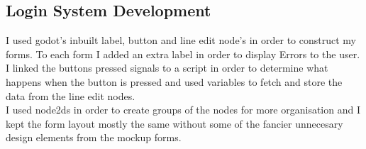 \documentclass{article}
\begin{document}
        \subsection{Login System Development}
        I used godot's inbuilt label, button and line edit node's in order to construct my forms. To each form I added an extra label in order to display Errors to the user.\\
        I linked the buttons pressed signals to a script in order to determine what happens when the button is pressed and used variables to fetch and store the data from the line edit nodes.\\
        I used node2ds in order to create groups of the nodes for more organisation and I kept the form layout mostly the same without some of the fancier unnecesary design elements from the mockup forms.\\
        \newpage
\end{document}
